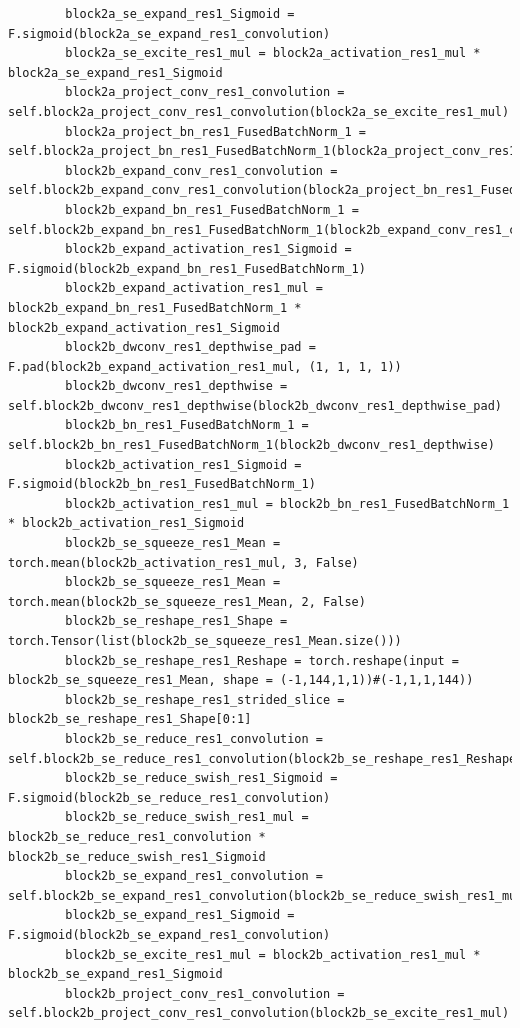 \documentclass{fisatprojectfinal}
\begin{document}
\begin{appendices}
\begin{lstlisting}
        block2a_se_expand_res1_Sigmoid = F.sigmoid(block2a_se_expand_res1_convolution)
        block2a_se_excite_res1_mul = block2a_activation_res1_mul * block2a_se_expand_res1_Sigmoid
        block2a_project_conv_res1_convolution = self.block2a_project_conv_res1_convolution(block2a_se_excite_res1_mul)
        block2a_project_bn_res1_FusedBatchNorm_1 = self.block2a_project_bn_res1_FusedBatchNorm_1(block2a_project_conv_res1_convolution)
        block2b_expand_conv_res1_convolution = self.block2b_expand_conv_res1_convolution(block2a_project_bn_res1_FusedBatchNorm_1)
        block2b_expand_bn_res1_FusedBatchNorm_1 = self.block2b_expand_bn_res1_FusedBatchNorm_1(block2b_expand_conv_res1_convolution)
        block2b_expand_activation_res1_Sigmoid = F.sigmoid(block2b_expand_bn_res1_FusedBatchNorm_1)
        block2b_expand_activation_res1_mul = block2b_expand_bn_res1_FusedBatchNorm_1 * block2b_expand_activation_res1_Sigmoid
        block2b_dwconv_res1_depthwise_pad = F.pad(block2b_expand_activation_res1_mul, (1, 1, 1, 1))
        block2b_dwconv_res1_depthwise = self.block2b_dwconv_res1_depthwise(block2b_dwconv_res1_depthwise_pad)
        block2b_bn_res1_FusedBatchNorm_1 = self.block2b_bn_res1_FusedBatchNorm_1(block2b_dwconv_res1_depthwise)
        block2b_activation_res1_Sigmoid = F.sigmoid(block2b_bn_res1_FusedBatchNorm_1)
        block2b_activation_res1_mul = block2b_bn_res1_FusedBatchNorm_1 * block2b_activation_res1_Sigmoid
        block2b_se_squeeze_res1_Mean = torch.mean(block2b_activation_res1_mul, 3, False)
        block2b_se_squeeze_res1_Mean = torch.mean(block2b_se_squeeze_res1_Mean, 2, False)
        block2b_se_reshape_res1_Shape = torch.Tensor(list(block2b_se_squeeze_res1_Mean.size()))
        block2b_se_reshape_res1_Reshape = torch.reshape(input = block2b_se_squeeze_res1_Mean, shape = (-1,144,1,1))#(-1,1,1,144))
        block2b_se_reshape_res1_strided_slice = block2b_se_reshape_res1_Shape[0:1]
        block2b_se_reduce_res1_convolution = self.block2b_se_reduce_res1_convolution(block2b_se_reshape_res1_Reshape)
        block2b_se_reduce_swish_res1_Sigmoid = F.sigmoid(block2b_se_reduce_res1_convolution)
        block2b_se_reduce_swish_res1_mul = block2b_se_reduce_res1_convolution * block2b_se_reduce_swish_res1_Sigmoid
        block2b_se_expand_res1_convolution = self.block2b_se_expand_res1_convolution(block2b_se_reduce_swish_res1_mul)
        block2b_se_expand_res1_Sigmoid = F.sigmoid(block2b_se_expand_res1_convolution)
        block2b_se_excite_res1_mul = block2b_activation_res1_mul * block2b_se_expand_res1_Sigmoid
        block2b_project_conv_res1_convolution = self.block2b_project_conv_res1_convolution(block2b_se_excite_res1_mul)

\end{lstlisting}
\end{appendices}
\end{document}
